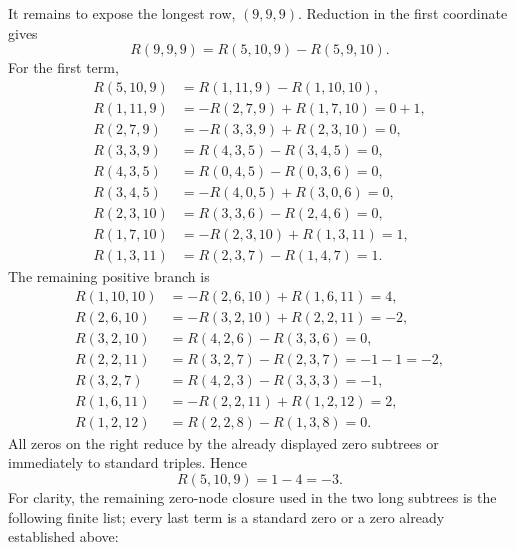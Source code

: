 \documentclass[11pt]{article}
\theoremstyle{definition}
\begin{document}
It remains to expose the longest row, $(9,9,9)$. Reduction in the first coordinate gives
\begin{equation}
R(9,9,9)=R(5,10,9)-R(5,9,10).
\label{eq:appC-999-first}
\end{equation}
For the first term,
\begin{align*}
R(5,10,9)
&=R(1,11,9)-R(1,10,10),\\
R(1,11,9)
&=-R(2,7,9)+R(1,7,10)=0+1,\\
R(2,7,9)
&=-R(3,3,9)+R(2,3,10)=0,\\
R(3,3,9)
&=R(4,3,5)-R(3,4,5)=0,\\
R(4,3,5)
&=R(0,4,5)-R(0,3,6)=0,\\
R(3,4,5)
&=-R(4,0,5)+R(3,0,6)=0,\\
R(2,3,10)
&=R(3,3,6)-R(2,4,6)=0,\\
R(1,7,10)
&=-R(2,3,10)+R(1,3,11)=1,\\
R(1,3,11)
&=R(2,3,7)-R(1,4,7)=1.
\end{align*}
The remaining positive branch is
\begin{align*}
R(1,10,10)
&=-R(2,6,10)+R(1,6,11)=4,\\
R(2,6,10)
&=-R(3,2,10)+R(2,2,11)=-2,\\
R(3,2,10)
&=R(4,2,6)-R(3,3,6)=0,\\
R(2,2,11)
&=R(3,2,7)-R(2,3,7)=-1-1=-2,\\
R(3,2,7)
&=R(4,2,3)-R(3,3,3)=-1,\\
R(1,6,11)
&=-R(2,2,11)+R(1,2,12)=2,\\
R(1,2,12)
&=R(2,2,8)-R(1,3,8)=0.
\end{align*}
All zeros on the right reduce by the already displayed zero subtrees or immediately to standard triples. Hence
\[
R(5,10,9)=1-4=-3.
\]
For clarity, the remaining zero-node closure used in the two long subtrees is the following finite list; every last term is a standard zero or a zero already established above:
\end{document}
